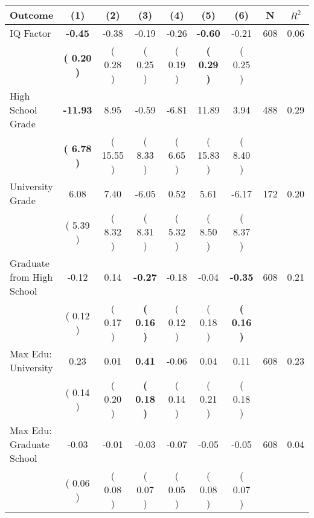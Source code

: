 \begin{tabular}{lcccccccc}
\toprule
 \textbf{Outcome} & \textbf{(1)} & \textbf{(2)} & \textbf{(3)} & \textbf{(4)} & \textbf{(5)} & \textbf{(6)} & \textbf{N} & \textbf{$ R^2$} \\
\midrule
IQ Factor & \textbf{    -0.45} &     -0.38 &     -0.19 &     -0.26 & \textbf{    -0.60} &     -0.21 & 608 &       0.06 \\ 
 & \textbf{(     0.20 )} & (     0.28 ) & (     0.25 ) & (     0.19 ) & \textbf{(     0.29 )} & (     0.25 ) & \\
High School Grade & \textbf{   -11.93} &      8.95 &     -0.59 &     -6.81 &     11.89 &      3.94 & 488 &       0.29 \\ 
 & \textbf{(     6.78 )} & (    15.55 ) & (     8.33 ) & (     6.65 ) & (    15.83 ) & (     8.40 ) & \\
University Grade &      6.08 &      7.40 &     -6.05 &      0.52 &      5.61 &     -6.17 & 172 &       0.20 \\ 
 & (     5.39 ) & (     8.32 ) & (     8.31 ) & (     5.32 ) & (     8.50 ) & (     8.37 ) & \\
Graduate from High School &     -0.12 &      0.14 & \textbf{    -0.27} &     -0.18 &     -0.04 & \textbf{    -0.35} & 608 &       0.21 \\ 
 & (     0.12 ) & (     0.17 ) & \textbf{(     0.16 )} & (     0.12 ) & (     0.18 ) & \textbf{(     0.16 )} & \\
Max Edu: University &      0.23 &      0.01 & \textbf{     0.41} &     -0.06 &      0.04 &      0.11 & 608 &       0.23 \\ 
 & (     0.14 ) & (     0.20 ) & \textbf{(     0.18 )} & (     0.14 ) & (     0.21 ) & (     0.18 ) & \\
Max Edu: Graduate School &     -0.03 &     -0.01 &     -0.03 &     -0.07 &     -0.05 &     -0.05 & 608 &       0.04 \\ 
 & (     0.06 ) & (     0.08 ) & (     0.07 ) & (     0.05 ) & (     0.08 ) & (     0.07 ) & \\
\bottomrule
\end{tabular}
